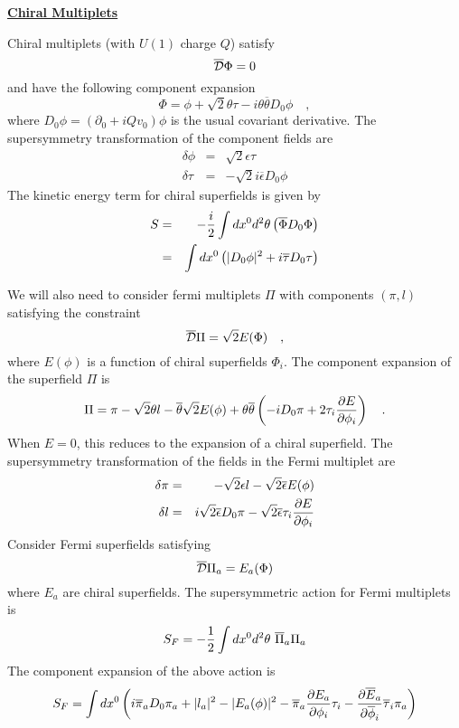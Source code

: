\documentclass[a4paper,12pt]{article}
\begin{document}
\begin{flushleft}
\underline{\bf Chiral Multiplets}
\end{flushleft}

Chiral multiplets (with $U(1)$ charge $Q$) satisfy
$$
\overline{\cal D} \Phi =0
$$
and have the following component expansion
\begin{equation}
\Phi = \phi + \sqrt2\theta \tau -i \theta \overline{\theta}
D_0 \phi\quad,
\end{equation}
where $D_0 \phi = (\partial_0 + iQ v_0 ) \phi$ is the usual covariant
derivative.
The supersymmetry transformation of the component fields are
\begin{eqnarray}
\delta\phi &=&  \sqrt2\epsilon \tau \\
\delta \tau &=& -\sqrt2 i \overline{\epsilon} D_0 \phi
\end{eqnarray} 
The kinetic energy term for chiral superfields is
given by
\begin{eqnarray}
S&=&-{i\over2}\int dx^0 d^2\theta \left(
\overline{\Phi} D_0 \Phi \right) \\
&=& \int dx^0 \left( |D_0\phi|^2 +i \overline{\tau}D_0 \tau\right)
\end{eqnarray}

We will also need to consider fermi multiplets $\Pi$ with
components $(\pi,l)$ satisfying the constraint
\begin{equation}
\overline{\cal D} \Pi = \sqrt2 E(\Phi)\quad,
\end{equation}
where $E(\phi)$ is a function of chiral superfields $\Phi_i$. 
The component expansion of the superfield $\Pi$ is
\begin{equation}
\Pi = \pi - \sqrt2 \theta l - \overline{\theta}\sqrt2  E(\phi)
+ \theta \overline{\theta} \left(-i D_0 \pi
+2 \tau_i {{\partial E}\over{\partial\phi_i}}\right)\\ \quad.
\end{equation}
When $E=0$, this reduces to the expansion of a chiral superfield.
The supersymmetry transformation of the fields in the Fermi multiplet are
\begin{eqnarray}
\delta\pi &=&-\sqrt2 \epsilon l -\sqrt2 \overline{\epsilon}E(\phi)\\
\delta l &=&  i\sqrt2 \overline{\epsilon} D_0 \pi 
-\sqrt2 \overline{\epsilon}\tau_i {{\partial E}\over{\partial \phi_i}}
\end{eqnarray}
Consider Fermi superfields satisfying
\begin{equation}
\overline{\cal D} \Pi_a = E_a(\Phi)
\end{equation}
where $E_a$ are chiral superfields. 
The supersymmetric action for Fermi multiplets is
\begin{equation}
S_F = -{1\over2}\int dx^0  d^2\theta\ \overline{\Pi}_a \Pi_a
\end{equation}
The component expansion of the above action is
\begin{equation}
S_F=\int dx^0 \left( i\overline{\pi}_aD_0 \pi_a + |l_a|^2 -
|E_a(\phi)|^2 - \overline{\pi}_a 
{{\partial E_a}\over{\partial \phi_i}}\tau_i - 
{{\partial \overline{E}_a}\over{\partial \overline{\phi}_i}}
\overline{\tau}_i \pi_a \right)
\end{equation}
\end{document}
